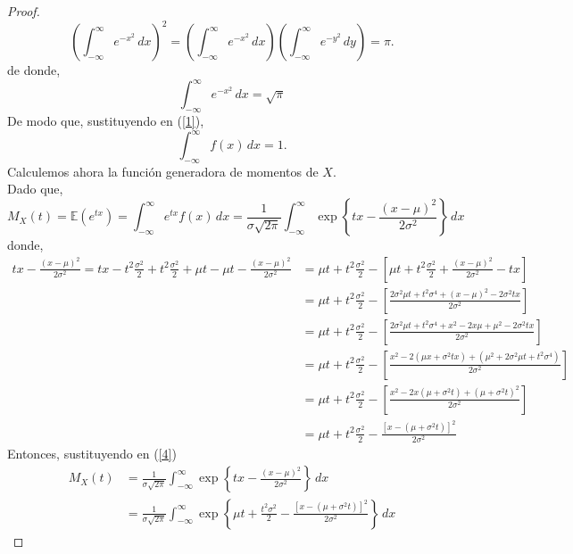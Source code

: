 \documentclass[12pt,legalpaper]{report}
\theoremstyle{plain} \newtheorem{teo}{Teorema}[chapter]
\theoremstyle{definition} \newtheorem{Def}[teo]{Definici\'on}
\begin{document}
\begin{proof}
\begin{equation*}
\left(\displaystyle\int_{-\infty}^{\infty}e^{-x^{2}}\,dx\right)^{2}
=\left(\displaystyle\int_{-\infty}^{\infty}e^{-x^{2}}\,dx\right)
\left(\displaystyle\int_{-\infty}^{\infty}e^{-y^{2}}\,dy\right)=\pi.
\end{equation*}
de donde,
\begin{equation*}
\displaystyle\int_{-\infty}^{\infty}e^{-x^{2}}\,dx=\sqrt{\pi}
\end{equation*}
De modo que, sustituyendo en (\ref{1}),
\begin{equation}\label{3}
\displaystyle\int_{-\infty}^{\infty}f(x)\,dx=1.
\end{equation}
Calculemos ahora la funci\'on generadora de momentos de $X$.\\
Dado que,
\begin{equation}\label{4}
M_{X}(t)=\mathbb{E}(e^{tx})=\int_{-\infty}^{\infty}e^{tx}f(x)\,dx
=\frac{1}{\sigma\sqrt{2\pi}}\int_{-\infty}^{\infty}\exp\left\{tx-\frac{(x-\mu)^{2}}{2\sigma^{2}}\right\}\,dx
\end{equation}
donde,
\begin{align*}
tx-\frac{(x-\mu)^{2}}{2\sigma^{2}}
=tx - t^{2}\frac{\sigma^{2}}{2}+t^{2}\frac{\sigma^{2}}{2}+\mu t-\mu t- \frac{(x-\mu)^{2}}{2\sigma^{2}}
&=\mu t +t^{2}\frac{\sigma^{2}}{2}-\left[\mu t+ t^{2}\frac{\sigma^{2}}{2}+ \frac{(x-\mu)^{2}}{2\sigma^{2}} - tx \right]
\\&=\mu t +t^{2}\frac{\sigma^{2}}{2}-\left[\frac{2\sigma^{2}\mu t+t^{2}\sigma^{4}+(x-\mu)^{2}-2\sigma^{2}tx}{2\sigma^{2}}\right]
\\&=\mu t +t^{2}\frac{\sigma^{2}}{2}-\left[\frac{2\sigma^{2}\mu t+t^{2}\sigma^{4}+x^{2}-2x\mu+\mu^{2}-2\sigma^{2}tx}{2\sigma^{2}}\right]
\\&=\mu t +t^{2}\frac{\sigma^{2}}{2}-\left[\frac{x^{2}-2(\mu x+\sigma^{2}tx)+(\mu^{2}+2\sigma^{2}\mu t+t^{2}\sigma^{4})}{2\sigma^{2}}\right]
\\&=\mu t +t^{2}\frac{\sigma^{2}}{2}-\left[\frac{x^{2}-2x(\mu +\sigma^{2}t)+(\mu+\sigma^{2}t)^{2}}{2\sigma^{2}}\right]
\\&=\mu t +t^{2}\frac{\sigma^{2}}{2}-\frac{\left[x-(\mu+\sigma^{2}t)\right]^{2}}{{2\sigma^{2}}}
\end{align*}
Entonces, sustituyendo en (\ref{4})
\begin{align*}
\displaystyle M_{X}(t)&=\frac{1}{\sigma\sqrt{2\pi}} \int_{-\infty}^{\infty}\exp\left\{tx-\frac{(x-\mu)^{2}}{2\sigma^{2}}\right\}\,dx
\\&=\frac{1}{\sigma\sqrt{2\pi}}\int_{-\infty}^{\infty}\exp\left\{\mu t+\frac{t^{2}\sigma^{2}}{2}-\frac{\left[x-(\mu+\sigma^{2}t)\right]^{2}}{{2\sigma^{2}}}\right\}\,dx

\end{align*}
\end{proof}
\end{document}
